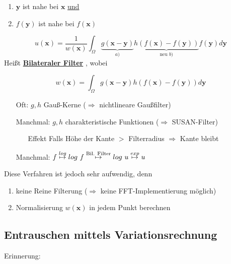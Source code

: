 \documentclass[ngerman]{article}
\theoremstyle{plain}
\theoremstyle{definition}
\numberwithin{equation}{section}
\newcommand{\mim}[1] {
\underline{\textbf{#1\index{#1}}}
}
\newcommand{\x}[0] {
  \boldsymbol{x}
}
\newcommand{\y}[0] {
    \boldsymbol{y}
}
\begin{document}
      \begin{enumerate}[label= \alph*)]
          \item $\y$ ist nahe bei $\x$ \underline{und}
          \item $f(\y)$ ist nahe bei $f(\x)$
      \end{enumerate}

      \[u(\x) = \frac{1}{w(\x)} \int_\Omega \underbrace{g(\x - \y)}_{a)} \underbrace{h(f(\x) - f(\y))}_{\text{neu }b)} f(\y) d\y\]
      Heißt \mim{Bilateraler Filter}, wobei

      \[w(\x) = \int_\Omega g(\x - \y) h(f(\x) - f(\y)) d\y\]

      \begin{enumerate}
          \item[Oft:] $g,h$ Gauß-Kerne ($\Rightarrow$ nichtlineare Gaußfilter)
          \item[Manchmal:] $g,h$ charakteristische Funktionen ($\Rightarrow$ SUSAN-Filter)
          \begin{enumerate}
              \item[Effekt] Falls Höhe der Kante $>$ Filterradius $\Rightarrow$ Kante bleibt
          \end{enumerate}
          \item[Manchmal:] $f \overset{log}{\mapsto} log \ f \overset{\small \text{Bil. Filter}}{\mapsto} log \ u \overset{exp}{\mapsto} u$
      \end{enumerate}
      Diese Verfahren ist jedoch sehr aufwendig, denn
      \begin{enumerate}[label=\textbullet]
          \item keine Reine Filterung ($\Rightarrow$ keine FFT-Implementierung möglich)
          \item Normalisierung $w(\x)$ in jedem Punkt berechnen
      \end{enumerate}

      \subsection{Entrauschen mittels Variationsrechnung}
      Erinnerung:
      \begin{center}
      \end{center}
\end{document}
